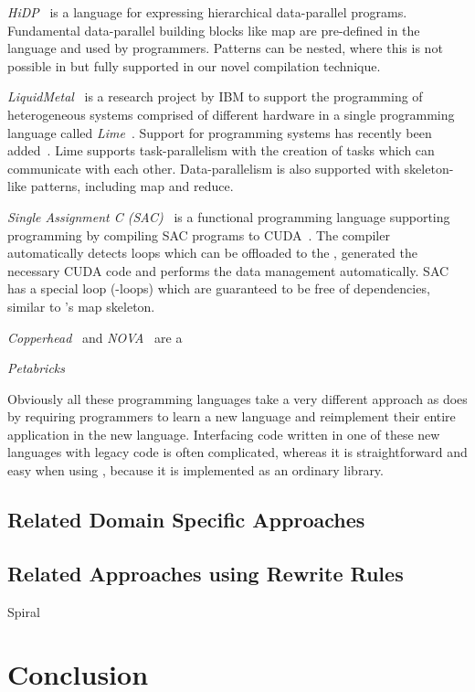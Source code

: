\bigskip

\emph{HiDP}~\cite{ZhangM13} is a language for expressing hierarchical data-parallel programs.
Fundamental data-parallel building blocks like map are pre-defined in the language and used by programmers.
Patterns can be nested, where this is not possible in \SkelCL but fully supported in our novel compilation technique.

\emph{LiquidMetal}~\cite{HuangHBR08} is a research project by IBM to support the programming of heterogeneous systems comprised of different hardware in a single programming language called \emph{Lime}~\cite{AuerbachBCR10}.
Support for programming \GPU systems has recently been added~\cite{DubachCRBF12}.
Lime supports task-parallelism with the creation of tasks which can communicate with each other.
Data-parallelism is also supported with skeleton-like patterns, including map and reduce.

\emph{Single Assignment C (SAC)}~\cite{GrelckS06} is a functional programming language supporting \GPUs programming by compiling SAC programs to CUDA~\cite{GuoTS11}.
The compiler automatically detects loops which can be offloaded to the \GPU, generated the necessary CUDA code and performs the data management automatically. 
SAC has a special loop (-loops) which are guaranteed to be free of dependencies, similar to \SkelCL's map skeleton.


\emph{Copperhead}~\cite{} and \emph{NOVA}~\cite{} are a 

\emph{Petabricks}~\cite{}

\bigskip
Obviously all these programming languages take a very different approach as \SkelCL does by requiring programmers to learn a new language and reimplement their entire application in the new language.
Interfacing code written in one of these new languages with legacy code is often complicated, whereas it is straightforward and easy when using \SkelCL, because it is implemented as an ordinary \Cpp library.

\subsection{Related Domain Specific Approaches}


\subsection{Related Approaches using Rewrite Rules}
Spiral~\cite{OfenbeckRSOP13}

\section{Conclusion}


